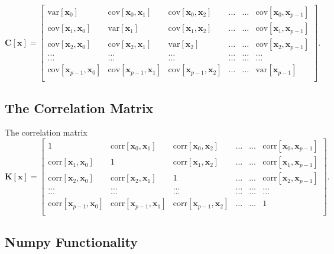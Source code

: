 \documentclass[%
oneside,                 %
final,                   %
10pt]{article}
\begin{document}
\[
\bm{C}[\bm{x}] = \begin{bmatrix}
\mathrm{var}[\bm{x}_0] & \mathrm{cov}[\bm{x}_0,\bm{x}_1]  & \mathrm{cov}[\bm{x}_0,\bm{x}_2] & \dots & \dots & \mathrm{cov}[\bm{x}_0,\bm{x}_{p-1}]\\
\mathrm{cov}[\bm{x}_1,\bm{x}_0] & \mathrm{var}[\bm{x}_1]  & \mathrm{cov}[\bm{x}_1,\bm{x}_2] & \dots & \dots & \mathrm{cov}[\bm{x}_1,\bm{x}_{p-1}]\\
\mathrm{cov}[\bm{x}_2,\bm{x}_0]   & \mathrm{cov}[\bm{x}_2,\bm{x}_1] & \mathrm{var}[\bm{x}_2] & \dots & \dots & \mathrm{cov}[\bm{x}_2,\bm{x}_{p-1}]\\
\dots & \dots & \dots & \dots & \dots & \dots \\
\dots & \dots & \dots & \dots & \dots & \dots \\
\mathrm{cov}[\bm{x}_{p-1},\bm{x}_0]   & \mathrm{cov}[\bm{x}_{p-1},\bm{x}_1] & \mathrm{cov}[\bm{x}_{p-1},\bm{x}_{2}]  & \dots & \dots  & \mathrm{var}[\bm{x}_{p-1}]\\
\end{bmatrix}.
\]

\subsection{The Correlation Matrix}

The correlation matrix
\[
\bm{K}[\bm{x}] = \begin{bmatrix}
1 & \mathrm{corr}[\bm{x}_0,\bm{x}_1]  & \mathrm{corr}[\bm{x}_0,\bm{x}_2] & \dots & \dots & \mathrm{corr}[\bm{x}_0,\bm{x}_{p-1}]\\
\mathrm{corr}[\bm{x}_1,\bm{x}_0] & 1  & \mathrm{corr}[\bm{x}_1,\bm{x}_2] & \dots & \dots & \mathrm{corr}[\bm{x}_1,\bm{x}_{p-1}]\\
\mathrm{corr}[\bm{x}_2,\bm{x}_0]   & \mathrm{corr}[\bm{x}_2,\bm{x}_1] & 1 & \dots & \dots & \mathrm{corr}[\bm{x}_2,\bm{x}_{p-1}]\\
\dots & \dots & \dots & \dots & \dots & \dots \\
\dots & \dots & \dots & \dots & \dots & \dots \\
\mathrm{corr}[\bm{x}_{p-1},\bm{x}_0]   & \mathrm{corr}[\bm{x}_{p-1},\bm{x}_1] & \mathrm{corr}[\bm{x}_{p-1},\bm{x}_{2}]  & \dots & \dots  & 1\\
\end{bmatrix}.
\]

\subsection{Numpy Functionality}
\end{document}
